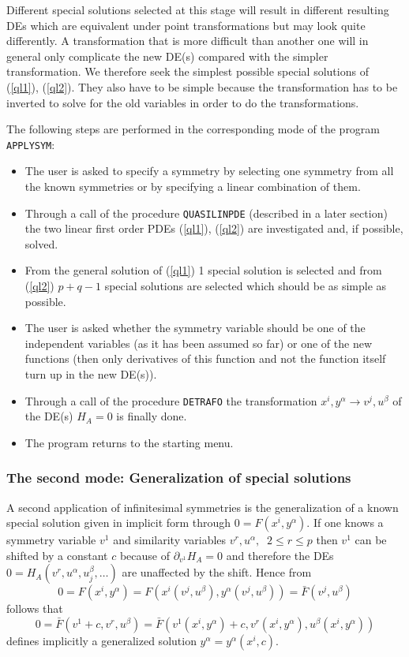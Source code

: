 Different special solutions selected at this stage
will result in different
resulting DEs which are equivalent under point transformations but may
look quite differently. A transformation that is more difficult than another
one will in general
only complicate the new DE(s) compared with the simpler transformation.
We therefore seek the simplest possible special
solutions of (\ref{ql1}), (\ref{ql2}). They also
have to be simple because the transformation has to be inverted to solve for
the old variables in order to do the transformations.

The following steps are performed in the corresponding mode of the
program \texttt{APPLYSYM}:
\begin{itemize}
\item The user is asked to specify a symmetry by selecting one symmetry
from all the known symmetries or by specifying a linear combination of them.
\item Through a call of the procedure \texttt{QUASILINPDE} (described in a later
section) the two linear first order PDEs (\ref{ql1}), (\ref{ql2}) are
investigated and, if possible, solved.
\item From the general solution of (\ref{ql1}) 1 special solution
is selected and from (\ref{ql2}) $p+q-1$ special
solutions are selected which should be as simple as possible.
\item The user is asked whether the symmetry variable should be one of the
independent variables (as it has been assumed so far) or one of the new
functions (then only derivatives of this function and not the function itself
turn up in the new DE(s)).
\item Through a call of the procedure \texttt{DETRAFO} the transformation
$x^i,y^\alpha \rightarrow v^j,u^\beta$ of the DE(s) $H_A=0$ is finally done.
\item The program returns to the starting menu.
\end{itemize}
\subsubsection{The second mode: Generalization of special solutions}
A second application of infinitesimal symmetries is the generalization
of a known special solution given in implicit form through
$0 = F(x^i,y^\alpha)$. If one knows a symmetry variable $v^1$ and
similarity variables $v^r, u^\alpha,\;\;2\leq r\leq p$ then
$v^1$ can be shifted by a constant $c$ because of
$\partial_{v^1}H_A = 0$ and
therefore the DEs $0 = H_A(v^r,u^\alpha,u^\beta_j,\ldots)$
are unaffected by the shift. Hence from
\[0 = F(x^i, y^\alpha) = F(x^i(v^j,u^\beta), y^\alpha(v^j,u^\beta)) =
\bar{F}(v^j,u^\beta)\] follows that
\[ 0 = \bar{F}(v^1+c,v^r,u^\beta) =
\bar{F}(v^1(x^i,y^\alpha)+c, v^r(x^i,y^\alpha), u^\beta(x^i,y^\alpha))\]
defines implicitly a generalized solution $y^\alpha=y^\alpha(x^i,c)$.

